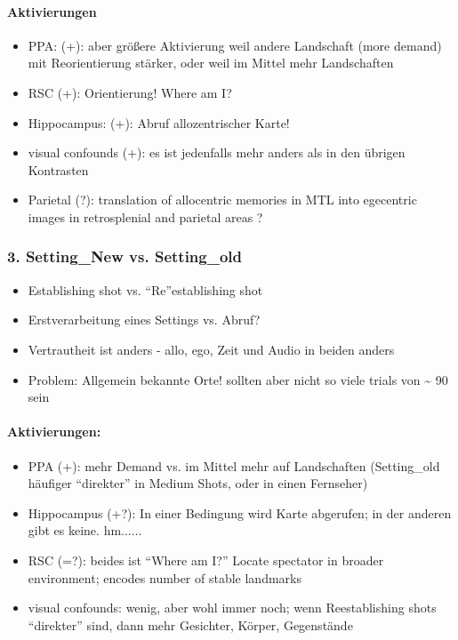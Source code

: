 \documentclass[10pt,a4paper,twocolumn]{article}
\begin{document}
\paragraph*{Aktivierungen}
\begin{itemize}
	\item PPA: (+): aber größere Aktivierung weil andere Landschaft (more demand)
	mit Reorientierung stärker, oder weil im Mittel mehr Landschaften 
	\item RSC (+): Orientierung! Where am I?
	\item Hippocampus: (+): Abruf allozentrischer Karte!
	\item visual confounds (+): es ist jedenfalls mehr anders als in den übrigen
	Kontrasten
	\item Parietal (?): translation of allocentric memories in MTL into egecentric
	images in retrosplenial and parietal areas \citep{bird_2012_hippocampus_contraints_imagery}?
\end{itemize}

\subsubsection*{3. Setting\_New vs. Setting\_old }
\begin{itemize}
	\item Establishing shot vs. ``Re''establishing shot
	\item Erstverarbeitung eines Settings vs. Abruf?
	\item Vertrautheit ist anders - allo, ego, Zeit und Audio in beiden anders
	\item Problem: Allgemein bekannte Orte! sollten aber nicht so viele trials
	von \textasciitilde{} 90 sein
\end{itemize}

\paragraph*{Aktivierungen:}
\begin{itemize}
	\item PPA (+): mehr Demand vs. im Mittel mehr auf Landschaften (Setting\_old
	häufiger ``direkter'' in Medium Shots, oder in einen Fernseher)
	\item Hippocampus (+?): In einer Bedingung wird Karte abgerufen; in der
	anderen gibt es keine. hm......
	\item RSC (=?): beides ist ``Where am I?'' Locate spectator in broader
	environment; encodes number of stable landmarks
	\item visual confounds: wenig, aber wohl immer noch; wenn Reestablishing
	shots ``direkter'' sind, dann mehr Gesichter, Körper, Gegenstände
\end{itemize}
\end{document}
